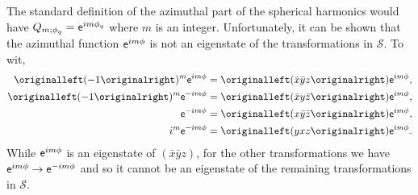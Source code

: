 The standard definition of the azimuthal part of the spherical harmonics would
have $Q_{m;\phi_{q}} = \mathsf{e}^{i m \phi_{q}}$ where $m$ is an integer.
Unfortunately, it can be shown that the azimuthal function $\mathsf{e}^{ i m\phi }$ is
not an eigenstate of the transformations in $\mathcal{S}$. To wit,
\begin{align}
  \left(-1\right)^{m}\e^{\im m \phi}
  & =
    \left(\bar{x}\bar{y}z\right)
    \e^{\im m \phi},
  \\
  \left(-1\right)^{m}\e^{-\im m \phi}
  & =
    \left(\bar{x}y\bar{z}\right)
    \e^{\im m \phi},
  \\
  \e^{-\im m \phi}
  & =
    \left(x\bar{y}\bar{z}\right)
    \e^{\im m \phi},
  \\
  \im^{m}\e^{-\im m \phi}
  & =
    \left(yxz\right)
    \e^{\im m \phi}.
\end{align}
While $\mathsf{e}^{i m \phi}$ is an eigenstate of $\left(\bar{x}\bar{y}z\right)$, for
the other transformations we have $\mathsf{e}^{i m \phi} \rightarrow \mathsf{e}^{-i m \phi}$
and so it cannot be an eigenstate of the remaining transformations in
$\mathcal{S}$.

